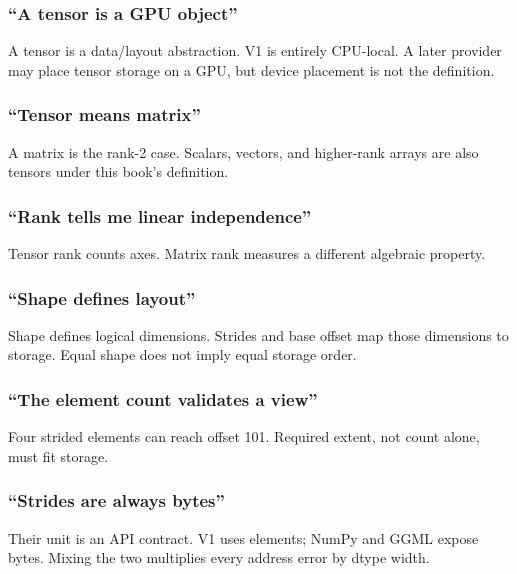 \documentclass[
  10pt,
]{article}
\begin{document}
\subsubsection{``A tensor is a GPU
object''}\label{a-tensor-is-a-gpu-object}

A tensor is a data/layout abstraction. V1 is entirely CPU-local. A later
provider may place tensor storage on a GPU, but device placement is not
the definition.

\subsubsection{``Tensor means matrix''}\label{tensor-means-matrix}

A matrix is the rank-2 case. Scalars, vectors, and higher-rank arrays
are also tensors under this book's definition.

\subsubsection{``Rank tells me linear
independence''}\label{rank-tells-me-linear-independence}

Tensor rank counts axes. Matrix rank measures a different algebraic
property.

\subsubsection{``Shape defines layout''}\label{shape-defines-layout}

Shape defines logical dimensions. Strides and base offset map those
dimensions to storage. Equal shape does not imply equal storage order.

\subsubsection{``The element count validates a
view''}\label{the-element-count-validates-a-view}

Four strided elements can reach offset 101. Required extent, not count
alone, must fit storage.

\subsubsection{``Strides are always
bytes''}\label{strides-are-always-bytes}

Their unit is an API contract. V1 uses elements; NumPy and GGML expose
bytes. Mixing the two multiplies every address error by dtype width.
\end{document}
